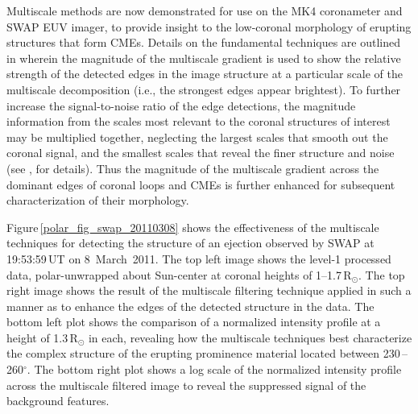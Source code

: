 \documentclass[namedreferences]{solarphysics}
\begin{document}
\begin{article}
Multiscale methods are now demonstrated for use on the MK4 coronameter and SWAP EUV imager, to provide insight to the low-coronal morphology of erupting structures that form CMEs. Details on the fundamental techniques are outlined in  wherein the magnitude of the multiscale gradient is used to show the relative strength of the detected edges in the image structure at a particular scale of the multiscale decomposition (i.e., the strongest edges appear brightest). To further increase the signal-to-noise ratio of the edge detections, the magnitude information from the scales most relevant to the coronal structures of interest may be multiplied together, neglecting the largest scales that smooth out the coronal signal, and the smallest scales that reveal the finer structure and noise (see , for details). Thus the magnitude of the multiscale gradient across the dominant edges of coronal loops and CMEs is further enhanced for subsequent characterization of their morphology. 

Figure\,\ref{polar_fig_swap_20110308} shows the effectiveness of the multiscale techniques for detecting the structure of an ejection observed by SWAP at 19:53:59\,UT on 8~March~2011. The top left image shows the level-1 processed data, polar-unwrapped about Sun-center at coronal heights of 1--1.7\,R$_{\odot}$. The top right image shows the result of the multiscale filtering technique applied in such a manner as to enhance the edges of the detected structure in the data. The bottom left plot shows the comparison of a normalized intensity profile at a height of 1.3\,R$_{\odot}$ in each, revealing how the multiscale techniques best characterize the complex structure of the erupting prominence material located between  230\,--\,260$^\circ$. The bottom right plot shows a log scale of the normalized intensity profile across the multiscale filtered image to reveal the suppressed signal of the background features.


\end{article}
\end{document}
